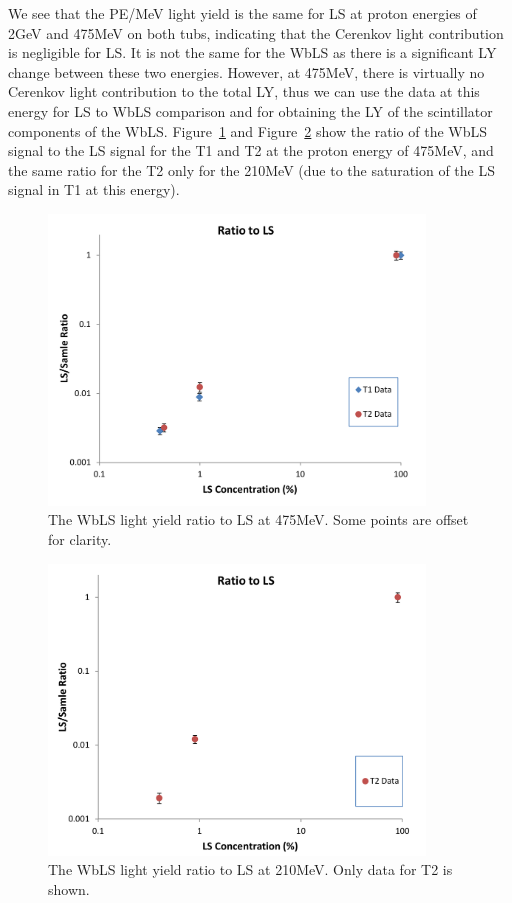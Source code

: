 \documentclass[preprint,12pt]{elsarticle}
\begin{document}
We see that the PE/MeV light yield is the same for LS at proton energies of 2GeV and 475MeV on both tubs, indicating that the Cerenkov light contribution is negligible for LS. It is not the same for the WbLS as there is a significant LY change between these two energies. However, at 475MeV, there is virtually no Cerenkov light contribution to the total LY, thus we can use the data at this energy for LS to WbLS comparison and for obtaining the LY of the scintillator components of the WbLS. Figure~\ref{fig:475MEV_RatioToLS} and Figure~\ref{fig:210MEV_RatioToLS} show the ratio of the WbLS signal to the LS signal for the T1 and T2 at the proton energy of 475MeV, and the same ratio for the T2 only for the 210MeV (due to the saturation of the LS signal in T1 at this energy).

\begin{figure}[ht]
	\centering
		\includegraphics[width=100mm]{475MEV_RatioToLS.pdf}
	\caption{The WbLS light yield ratio to LS at 475MeV. Some points are offset for clarity.}
	\label{fig:475MEV_RatioToLS}
\end{figure}

\begin{figure}[ht]
	\centering
		\includegraphics[width=100mm]{210MEV_RatioToLS.pdf}
	\caption{The WbLS light yield ratio to LS at 210MeV. Only data for T2 is shown.}
	\label{fig:210MEV_RatioToLS}
\end{figure}
\end{document}
